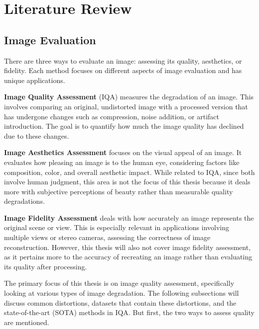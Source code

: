 \chapter{Literature Review}
\label{ch:LiteratureReview}

\section{Image Evaluation}
\label{sec:ImageEvaluation}
There are three ways to evaluate an image: assessing its quality, aesthetics, or fidelity. Each method focuses on different aspects of image evaluation and has unique applications. \par
\vspace{\baselineskip}
\noindent
\textbf{Image Quality Assessment} (IQA) measures the degradation of an image. This involves comparing an original, undistorted image with a processed version that has undergone changes such as compression, noise addition, or artifact introduction. The goal is to quantify how much the image quality has declined due to these changes.\par
\vspace{\baselineskip}
\noindent
\textbf{Image Aesthetics Assessment} focuses on the visual appeal of an image. It evaluates how pleasing an image is to the human eye, considering factors like composition, color, and overall aesthetic impact. While related to IQA, since both involve human judgment, this area is not the focus of this thesis because it deals more with subjective perceptions of beauty rather than measurable quality degradations. \par
\vspace{\baselineskip}
\noindent
\textbf{Image Fidelity Assessment} deals with how accurately an image represents the original scene or view. This is especially relevant in applications involving multiple views or stereo cameras, assessing the correctness of image reconstruction. However, this thesis will also not cover image fidelity assessment, as it pertains more to the accuracy of recreating an image rather than evaluating its quality after processing. \par
\vspace{\baselineskip}
\noindent
The primary focus of this thesis is on image quality assessment, specifically looking at various types of image degradation. The following subsections will discuss common distortions, datasets that contain these distortions, and the state-of-the-art (SOTA) methods in IQA. But first, the two ways to assess quality are mentioned. \par


